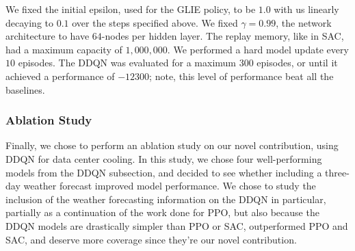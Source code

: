 \documentclass[12pt]{article}
\begin{document}
We fixed the initial epsilon, used for the GLIE policy, to be $1.0$ with us linearly decaying to $0.1$ over the steps specified above. We fixed $\gamma = 0.99$, the network architecture to have $64$-nodes per hidden layer. The replay memory, like in SAC, had a maximum capacity of $1,000,000$. We performed a hard model update every $10$ episodes. The DDQN was evaluated for a maximum 300 episodes, or until it achieved a performance of $-12300$; note, this level of performance beat all the baselines. 

\subsubsection{Ablation Study}

Finally, we chose to perform an ablation study on our novel contribution, using DDQN for data center cooling. In this study, we chose four well-performing models from the DDQN subsection, and decided to see whether including a three-day weather forecast improved model performance. We chose to study the inclusion of the weather forecasting information on the DDQN in particular, partially as a continuation of the work done for PPO, but also because the DDQN models are drastically simpler than PPO or SAC, outperformed PPO and SAC, and deserve more coverage since they're our novel contribution.




\end{document}

